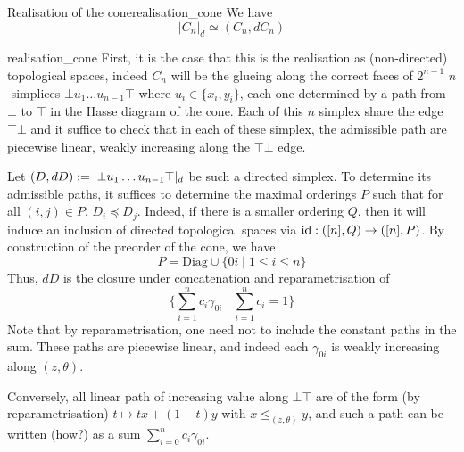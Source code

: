\begin{cprop}{Realisation of the cone}{realisation_cone}
    We have 
    \begin{equation*}
        |C_n|_d \simeq (C_n, dC_n)
    \end{equation*}
\end{cprop}
\begin{propproof}{realisation_cone}
    First, it is the case that this is the realisation as (non-directed) topological spaces, indeed \( C_n \) will be the glueing along the correct faces of \( 2^{n-1} \)  \( n \)-simplices \( \bot u_1\dots u_{n-1} \top\) where \( u_i \in \{ x_i, y_i \} \), each one determined by a path from \( \bot \) to \( \top \) in the Hasse diagram of the cone. Each of this \( n \) simplex share the edge \( \top\bot \) and it suffice to check that in each of these simplex, the admissible path are piecewise linear, weakly increasing along the \( \top\bot \) edge.  
    
    Let \( (D, dD) := |\bot u_1\dots u_{n-1} \top|_d \) be such a directed simplex. To determine its admissible paths, it suffices to determine the maximal orderings \( P \) such that for all \( (i, j) \in P \), \( D_i \preceq D_j \). Indeed, if there is a smaller ordering \( Q \), then it will induce an inclusion of directed topological spaces via \( \mathrm{id} : ([n], Q) \to ([n], P) \). By construction of the preorder of the cone, we have
    \begin{equation*}
        P = \text{Diag} \cup \{ 0i \mid 1 \le i \le n \} 
    \end{equation*}
    Thus, \( dD \) is the closure under concatenation and reparametrisation of
    \begin{equation*}
        \{ \sum_{i=1}^n c_i \gamma_{0i} \mid \sum_{i=1}^n c_i = 1 \}
    \end{equation*}
    Note that by reparametrisation, one need not to include the constant paths in the sum. These paths are piecewise linear, and indeed each \( \gamma_{0i} \) is weakly increasing along \( (z, \theta) \). 
    
    Conversely, all linear path of increasing value along \( \bot\top \) are of the form (by reparametrisation) \( t \mapsto tx + (1-t)y  \) with \( x \le_{(z, \theta)} y \), and such a path can be written (how?) as a sum \( \sum\limits_{i=0}^n c_i \gamma_{0i} \).
\end{propproof}

